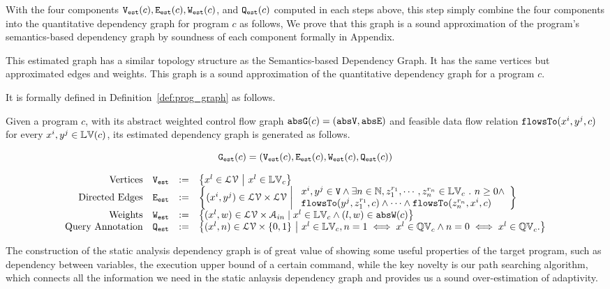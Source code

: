 With the four components $\mathtt{{V_{est}}}(c), \mathtt{{E_{est}}}(c), \mathtt{{W_{est}}}(c)$, and $\mathtt{{Q_{est}}}(c)$
computed in each steps above, this step simply combine the four components into the quantitative dependency graph for program $c$ as follows,
%
\highlight{
  \[
    \progG(c) = (\progV(c), \progE(c), \progW(c), \progF(c)).
    \]
}
We prove that this graph is a sound approximation of the program's semantics-based dependency graph by soundness of each component formally in Appendix.

This estimated graph has a similar topology structure as 
the Semantics-based Dependency Graph. It has the same
vertices 
but approximated edges and weights.  
This graph is a sound approximation of the quantitative dependency graph for a program $c$.

It is formally defined in Definition~\ref{def:prog_graph} as follows.

\begin{defn}
\label{def:prog_graph}
Given a program $c$, with its abstract weighted control flow graph $\mathtt{abs}{\mathtt{G}}(c) = (\mathtt{abs}{\mathtt{V}}, \mathtt{abs}{\mathtt{E}})$ and 
feasible data flow relation $\mathtt{flowsTo}(x^i, y^j, c)$ for every $x^i, y^j \in \mathbb{LV}(c)$, its estimated dependency graph
is generated as follows.

\[\mathtt{{G_{est}}}(c) = (\mathtt{{V_{est}}}(c), \mathtt{{E_{est}}}(c), \mathtt{{W_{est}}}(c), \mathtt{{Q_{est}}}(c))\]

{
\[
\begin{array}{rlcl}
\text{Vertices} &
\progV & := & \left\{ 
x^l \in \mathcal{LV} 
~ \middle\vert ~
x^l \in \lvar_{c}
\right\}
\\
\text{Directed Edges} &
\progE & := & 
\left\{ 
(x^i, y^j) \in \mathcal{LV} \times \mathcal{LV}
~ \middle\vert ~
\begin{array}{l}
x^i, y^j \in \vertxs
\land
\exists n \in \mathbb{N}, z_1^{r_1}, \cdots, z_n^{r_n} \in \lvar_{{c}} \st 
n \geq 0 \land
\\
\flowsto(y^j,  z_1^{r_1}, c) 
\land \cdots \land \flowsto(z_n^{r_n}, x^i, c) 
\end{array}
\right\}
\\
\text{Weights} &
\progW & := &
\left\{ (x^l, w) \in  \mathcal{LV} \times \mathcal{A}_{in}
\mid
x^l \in \lvar_{{c}} \land (l, w) \in \absW(c)
\right\}
\\
\text{Query Annotation} &
\progF & := & 
\left\{(x^l, n)  \in  \mathcal{LV} \times \{0, 1\} 
~ \middle\vert ~
x^l \in \lvar_{c},
n = 1 \iff x^l \in \qvar_{c} \land n = 0 \iff  x^l \in \qvar_{c} .
\right\}
\end{array}
\] }
\end{defn}
The construction of the static analysis dependency graph is of great value of showing some useful properties of the target program,
such as dependency between variables, the execution upper bound of a certain command,
while the key novelty is our path searching algorithm, which connects all the information we need in the static anlaysis dependency graph and provides us a sound over-estimation of adaptivity.
